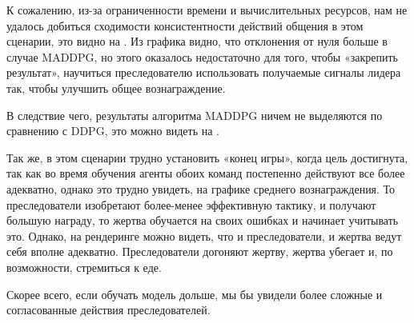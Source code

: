 К сожалению, из-за ограниченности времени и вычислительных ресурсов, нам не удалось добиться сходимости консистентности действий общения в этом сценарии, это видно на . Из графика видно, что отклонения от нуля больше в случае MADDPG, но этого оказалось недостаточно для того, чтобы «закрепить результат», научиться преследователю использовать получаемые сигналы лидера так, чтобы улучшить общее вознаграждение.

В следствие чего, результаты алгоритма MADDPG ничем не выделяются по сравнению с DDPG, это можно видеть на .

Так же, в этом сценарии трудно установить «конец игры», когда цель достигнута, так как во время обучения агенты обоих команд постепенно действуют все более адекватно, однако это трудно увидеть, на графике среднего вознаграждения. То преследователи изобретают более-менее эффективную тактику, и получают большую награду, то жертва обучается на своих ошибках и начинает учитывать это. Однако, на рендеринге можно видеть, что и преследователи, и жертва ведут себя вполне адекватно. Преследователи догоняют жертву, жертва убегает и, по возможности, стремиться к еде.

Скорее всего, если обучать модель дольше, мы бы увидели более сложные и согласованные действия преследователей.
